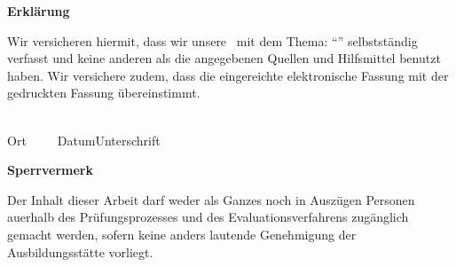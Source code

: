 

\newpage
\thispagestyle{empty}
\begin{framed}
\begin{center}
\Large\bfseries Erklärung
\end{center}
\medskip
\noindent
Wir versicheren hiermit, dass wir unsere \Was\ mit
dem Thema: \enquote{\Titel} selbstständig verfasst und keine anderen als die angegebenen Quellen und
Hilfsmittel benutzt haben. Wir versichere zudem, dass die eingereichte elektronische Fassung mit der
gedruckten Fassung übereinstimmt.

\vspace{3cm}
\noindent
\underline{\hspace{4cm}}\hfill\underline{\hspace{6cm}}\\
Ort~~~~~Datum\hfill Unterschrift\hspace{4cm}
\end{framed}

\vfill
\begin{framed}
\begin{center}
\Large\bfseries Sperrvermerk
\end{center}
\medskip
\noindent
Der Inhalt dieser Arbeit darf weder als Ganzes noch in Auszügen Personen
auerhalb des Prüfungsprozesses und des Evaluationsverfahrens zugänglich gemacht
werden, sofern keine anders lautende Genehmigung der Ausbildungsstätte vorliegt.
\end{framed}

\endinput
